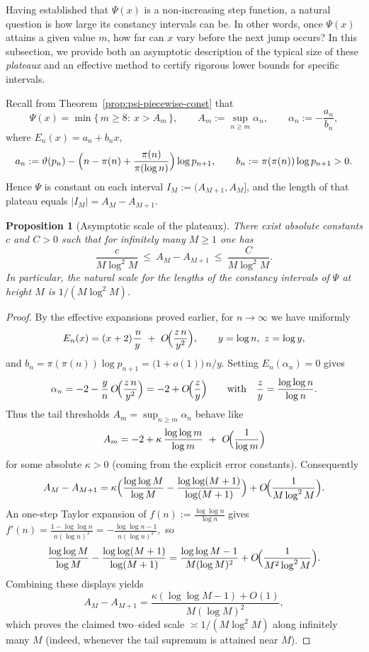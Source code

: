 \documentclass[10pt]{amsart}
\newtheorem{proposition}{Proposition}[section] %
\theoremstyle{definition} %
\numberwithin{equation}{section}
\begin{document}
Having established that $\Psi(x)$ is a non-increasing step function, 
a natural question is how large its constancy intervals can be. 
In other words, once $\Psi(x)$ attains a given value $m$, how far can $x$ vary 
before the next jump occurs? In this subsection, we provide both an 
asymptotic description of the typical size of these \emph{plateaux} and an 
effective method to certify rigorous lower bounds for specific intervals.

Recall from Theorem~\ref{prop:psi-piecewise-const} that
\[
\Psi(x)=\min\{\,m\ge 8:\ x>A_m\,\}\!,
\qquad
A_m:=\sup_{n\ge m}\alpha_n,
\qquad
\alpha_n:=-\frac{a_n}{b_n},
\]
where $E_n(x)=a_n+b_n x$,
\[
a_n:=\vartheta(p_n)-\Bigl(n-\pi(n)+\frac{\pi(n)}{\pi(\log n)}\Bigr)\log p_{n+1},\qquad
b_n:=\pi(\pi(n))\log p_{n+1}>0.
\]
Hence \(\Psi\) is constant on each interval \(I_M:=(A_{M+1},A_M]\), and the length of that
plateau equals \(|I_M|=A_M-A_{M+1}\).

\begin{proposition}[Asymptotic scale of the plateaux]\label{prop:plateau-scale}
There exist absolute constants \(c\) and \(C>0\) such that for infinitely many \(M\geq 1\) one has
\[
\frac{c}{M\log^2 M}\ \le\ A_M-A_{M+1}\ \le\ \frac{C}{M\log^2 M}.
\]
In particular, the \emph{natural scale} for the lengths of the constancy intervals of
\(\Psi\) at height \(M\) is \(1/(M\log^2 M)\).
\end{proposition}

\begin{proof}
By the effective expansions proved earlier, for \(n\to\infty\) we have uniformly
\[
E_n(x)=(x+2)\frac{\,n}{y}\ +\ O\!\Bigl(\frac{z\,n}{y^2}\Bigr),
\qquad y=\log n,\ z=\log y,
\]
and \(b_n=\pi(\pi(n))\log p_{n+1}=\bigl(1+o(1)\bigr)\,n/y\).
Setting \(E_n(\alpha_n)=0\) gives
\[
\alpha_n=-2-\frac{y}{n}\,O\!\Bigl(\frac{z\,n}{y^2}\Bigr)=-2+O\!\Bigl(\frac{z}{y}\Bigr)
\qquad\text{with}\quad \frac{z}{y}=\frac{\log\log n}{\log n}.
\]
Thus the tail thresholds \(A_m=\sup_{n\ge m}\alpha_n\) behave like
\[
A_m=-2+\kappa\,\frac{\log\log m}{\log m}\ +\ O\!\Bigl(\frac{1}{\log m}\Bigr)
\]
for some absolute \(\kappa>0\) (coming from the explicit error constants).
Consequently
\[
A_M-A_{M+1}=\kappa\Bigl(\frac{\log\log M}{\log M}-\frac{\log\log(M+1)}{\log(M+1)}\Bigr)
+O\!\Bigl(\frac{1}{M\log^2 M}\Bigr).
\]
An one-step Taylor expansion of \(f(n):=\frac{\log\log n}{\log n}\) gives
\(
f'(n)=\frac{1-\log\log n}{n(\log n)^2}=-\frac{\log\log n-1}{n(\log n)^2},
\)
so
\[
\frac{\log\log M}{\log M}-\frac{\log\log(M+1)}{\log(M+1)}
= \frac{\log\log M-1}{M(\log M)^2}+O\!\Bigl(\frac{1}{M^2\log^2 M}\Bigr).
\]
Combining these displays yields
\[
A_M-A_{M+1}=\frac{\kappa(\log\log M-1)+O(1)}{M(\log M)^2},
\]
which proves the claimed two–sided scale \( \asymp 1/(M\log^2 M)\) along
infinitely many \(M\) (indeed, whenever the tail supremum is attained near \(M\)).
\end{proof}
\end{document}
